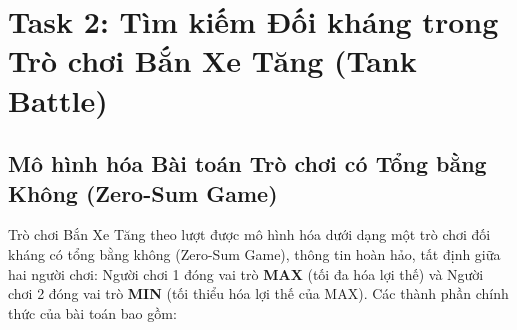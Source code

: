 
\section{Task 2: Tìm kiếm Đối kháng trong Trò chơi Bắn Xe Tăng (Tank Battle)}

\subsection{Mô hình hóa Bài toán Trò chơi có Tổng bằng Không (Zero-Sum Game)}
Trò chơi Bắn Xe Tăng theo lượt được mô hình hóa dưới dạng một trò chơi đối kháng có tổng bằng không (Zero-Sum Game), thông tin hoàn hảo, tất định giữa hai người chơi: Người chơi 1 đóng vai trò \textbf{MAX} (tối đa hóa lợi thế) và Người chơi 2 đóng vai trò \textbf{MIN} (tối thiểu hóa lợi thế của MAX). Các thành phần chính thức của bài toán bao gồm:

